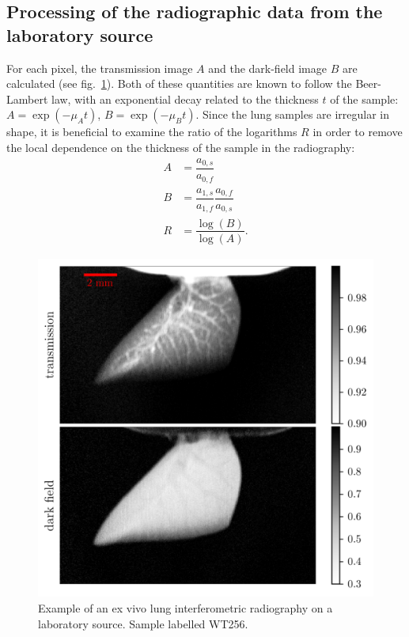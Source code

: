 \subsection{Processing of the radiographic data from the laboratory source}\label{sec:radioprocessing}
For each pixel, the transmission image $A$ and the
dark-field image $B$ are calculated (see fig.~\ref{590406}). Both of these
quantities are known to follow the Beer-Lambert law, with an exponential
decay related to the thickness $t$ of the sample: $A = \exp(-\mu_A t)$, $B =
\exp(-\mu_B t)$. Since the lung samples are irregular in shape, it is
beneficial to examine the ratio of the logarithms $R$ in
order to remove the local dependence on the thickness of the sample in the
radiography:
\begin{align}
    A &= \dfrac{a_{0,s}}{a_{0,f}}\\
    B &= \dfrac{a_{1,s}}{a_{1,f}}\dfrac{a_{0,f}}{a_{0,s}}\\
    R &= \dfrac{\log(B)}{\log(A)}.
    \label{eqn:definitions}
\end{align}
\begin{figure}[h!]
    \centering
    \includegraphics[width=0.70\columnwidth]{gfx/lung-paper-figures/KO373_LL_smoke/WT256_LL_smoke}
    \caption[Radiography of a mouse lung on a laboratory source]{Example of an ex vivo lung interferometric radiography on a laboratory
        source. Sample labelled WT256.
        {\label{590406}}}
\end{figure}

